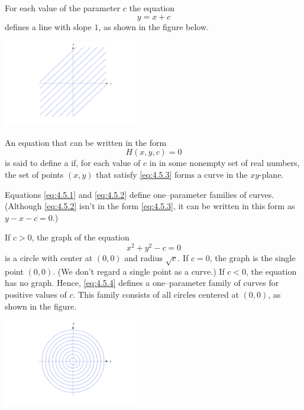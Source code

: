 \documentclass{ximera}
\begin{document}
\begin{example} \label{example:4.5.2}
For each value of the parameter $c$ the equation
\begin{equation} \label{eq:4.5.2}
y=x+c
\end{equation}
 defines a line with slope $1$, as shown in the figure below.
 
 \begin{image}
  \includegraphics[height=1.5in]{fig040502.jpg} 
\end{image}
\end{example}





\begin{definition}\label{thmtype:4.5.1}
An equation that can be written in the form
 \begin{equation} \label{eq:4.5.3}
H(x,y,c)=0
\end{equation}
is said to define a  if, for
each value of $c$ in in some nonempty set of real numbers, the set of
points $(x,y)$ that satisfy  \eqref{eq:4.5.3} forms a curve in the
$xy$-plane.
\end{definition}

Equations \eqref{eq:4.5.1} and \eqref{eq:4.5.2} define one--parameter families
of curves. (Although \eqref{eq:4.5.2} isn't  in the form \eqref{eq:4.5.3}, it
can be written in this form as $y-x-c=0$.)



\begin{example}\label{example:4.5.3}
If $c>0$,  the graph of the equation
\begin{equation} \label{eq:4.5.4}
x^2+y^2-c=0
\end{equation}
is a circle with center at $(0,0)$ and radius $\sqrt{c}$. If $c=0$, the
graph is the single point $(0,0)$. (We don't regard a single point as
a curve.) If $c<0$, the equation has no graph. Hence, \eqref{eq:4.5.4}
defines a one--parameter family of curves for positive values of $c$.
This family consists of all circles centered at $(0,0)$, as shown in the figure.

\begin{image}
  \includegraphics[height=1.5in]{fig040503.jpg} 
\end{image}

\end{example}
\end{document}
